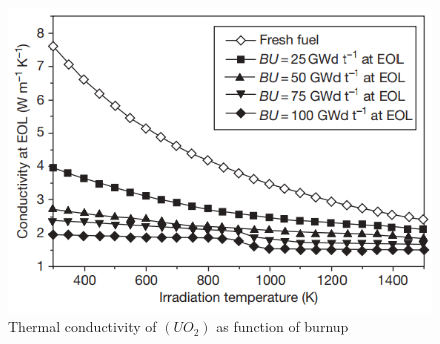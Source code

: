 \documentclass[12pt]{article}
\begin{document}
\begin{figure}
    \centering
    \includegraphics[width=0.7\linewidth]{figs/Thermal-conductivity-of-UO2-as-function-of-burn-up.png}
    \caption{Thermal conductivity of $(UO_{2})$ as function of burnup}
    \label{fig:fig_1}
\end{figure}
\end{document}
